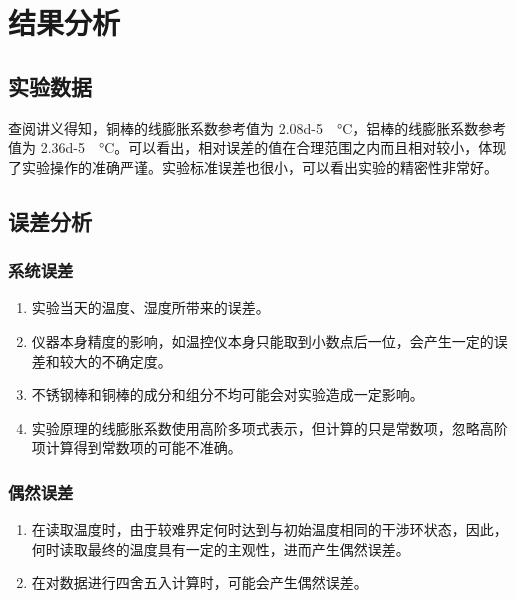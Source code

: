 \documentclass[a4paper,utf8]{article}
\begin{document}
\section{结果分析}
\subsection{实验数据}
查阅讲义得知，铜棒的线膨胀系数参考值为 \SI{2.08d-5}{\per\degreeCelsius}，铝棒的线膨胀系数参考值为 \SI{2.36d-5}{\per\degreeCelsius}。可以看出，相对误差的值在合理范围之内而且相对较小，体现了实验操作的准确严谨。实验标准误差也很小，可以看出实验的精密性非常好。
\subsection{误差分析}
\subsubsection{系统误差}
\begin{enumerate}
    \item 实验当天的温度、湿度所带来的误差。
    \item 仪器本身精度的影响，如温控仪本身只能取到小数点后一位，会产生一定的误差和较大的不确定度。
    \item 不锈钢棒和铜棒的成分和组分不均可能会对实验造成一定影响。
    \item 实验原理的线膨胀系数使用高阶多项式表示，但计算的只是常数项，忽略高阶项计算得到常数项的可能不准确。
\end{enumerate}
\subsubsection{偶然误差}
\begin{enumerate}
    \item 在读取温度时，由于较难界定何时达到与初始温度相同的干涉环状态，因此，何时读取最终的温度具有一定的主观性，进而产生偶然误差。
    \item 在对数据进行四舍五入计算时，可能会产生偶然误差。
\end{enumerate}
\end{document}
